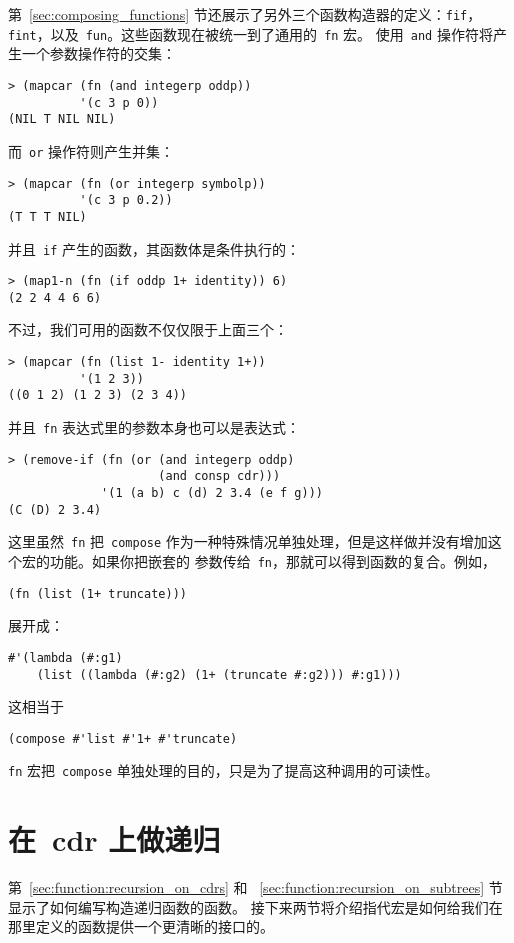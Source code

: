 第~\ref{sec:composing_functions} 节还展示了另外三个函数构造器的定义：\texttt{fif}，
\texttt{fint}，以及~\texttt{fun}。这些函数现在被统一到了通用的~\texttt{fn} 宏。
使用~\texttt{and} 操作符将产生一个参数操作符的交集：
\begin{lstlisting}
> (mapcar (fn (and integerp oddp))
          '(c 3 p 0))
(NIL T NIL NIL)
\end{lstlisting}
而~\texttt{or} 操作符则产生并集：
\begin{lstlisting}
> (mapcar (fn (or integerp symbolp))
          '(c 3 p 0.2))
(T T T NIL)
\end{lstlisting}
并且~\texttt{if} 产生的函数，其函数体是条件执行的：
\begin{lstlisting}
> (map1-n (fn (if oddp 1+ identity)) 6)
(2 2 4 4 6 6)
\end{lstlisting}
不过，我们可用的函数不仅仅限于上面三个：
\begin{lstlisting}
> (mapcar (fn (list 1- identity 1+))
          '(1 2 3))
((0 1 2) (1 2 3) (2 3 4))
\end{lstlisting}
并且~\texttt{fn} 表达式里的参数本身也可以是表达式：
\begin{lstlisting}
> (remove-if (fn (or (and integerp oddp)
                     (and consp cdr)))
             '(1 (a b) c (d) 2 3.4 (e f g)))
(C (D) 2 3.4)
\end{lstlisting}

这里虽然~\texttt{fn} 把~\texttt{compose} 作为一种特殊情况单独处理，但是这样做并没有增加这个宏的功能。如果你把嵌套的
参数传给~\texttt{fn}，那就可以得到函数的复合。例如，
\begin{lstlisting}
(fn (list (1+ truncate)))
\end{lstlisting}
展开成：
\begin{lstlisting}
#'(lambda (#:g1)
    (list ((lambda (#:g2) (1+ (truncate #:g2))) #:g1)))
\end{lstlisting}
这相当于
\begin{lstlisting}
(compose #'list #'1+ #'truncate)
\end{lstlisting}
\texttt{fn} 宏把~\texttt{compose} 单独处理的目的，只是为了提高这种调用的可读性。

\section{在~cdr 上做递归}
\label{sec:macro:recursion_on_cdrs}

第~\ref{sec:function:recursion_on_cdrs} 和
~\ref{sec:function:recursion_on_subtrees} 节显示了如何编写构造递归函数的函数。
接下来两节将介绍指代宏是如何给我们在那里定义的函数提供一个更清晰的接口的。

